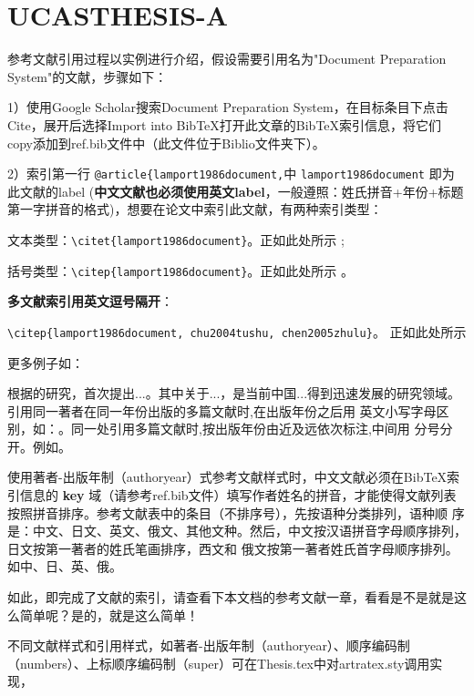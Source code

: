 \documentclass[twoside]{article}
\begin{document}
    \section*{UCASTHESIS-A}

参考文献引用过程以实例进行介绍，假设需要引用名为"Document Preparation System"的文献，步骤如下：

1）使用Google Scholar搜索Document Preparation System，在目标条目下点击Cite，展开后选择Import into BibTeX打开此文章的BibTeX索引信息，将它们copy添加到ref.bib文件中（此文件位于Biblio文件夹下）。

2）索引第一行 \verb|@article{lamport1986document,|中 \verb|lamport1986document| 即为此文献的label (\textbf{中文文献也必须使用英文label}，一般遵照：姓氏拼音+年份+标题第一字拼音的格式)，想要在论文中索引此文献，有两种索引类型：

文本类型：\verb|\citet{lamport1986document}|。正如此处所示 \textcite{lamport1986document};

括号类型：\verb|\citep{lamport1986document}|。正如此处所示 \cite{lamport1986document}。

\textbf{多文献索引用英文逗号隔开}：

\verb|\citep{lamport1986document, chu2004tushu, chen2005zhulu}|。
正如此处所示 \cite{lamport1986document, chu2004tushu, chen2005zhulu}

更多例子如：

\textcite{walls2013drought}根据\textcite{betts2005aging}的研究，首次提出...。其中关于...\cite{walls2013drought,betts2005aging}，是当前中国...得到迅速发展的研究领域\cite{chen1980zhongguo, bravo1990comparative}。引用同一著者在同一年份出版的多篇文献时,在出版年份之后用
英文小写字母区别，如：\cite{yuan2012lana, yuan2012lanb, yuan2012lanc}。同一处引用多篇文献时,按出版年份由近及远依次标注,中间用
分号分开。例如\cite{chen1980zhongguo,stamerjohanns2009mathml,hls2012jinji,niu2013zonghe}。

使用著者-出版年制（authoryear）式参考文献样式时，中文文献必须在BibTeX索引信息的 \textbf{key} 域（请参考ref.bib文件）填写作者姓名的拼音，才能使得文献列表按照拼音排序。参考文献表中的条目（不排序号），先按语种分类排列，语种顺 序是：中文、日文、英文、俄文、其他文种。然后，中文按汉语拼音字母顺序排列，日文按第一著者的姓氏笔画排序，西文和 俄文按第一著者姓氏首字母顺序排列。
如中\cite{niu2013zonghe}、日\cite{Bohan1928}、英\cite{stamerjohanns2009mathml}、俄\cite{Dubrovin1906}。

如此，即完成了文献的索引，请查看下本文档的参考文献一章，看看是不是就是这么简单呢？是的，就是这么简单！

不同文献样式和引用样式，如著者-出版年制（authoryear）、顺序编码制（numbers）、上标顺序编码制（super）可在Thesis.tex中对artratex.sty调用实现，

    \printbibliography

    
\end{document}
